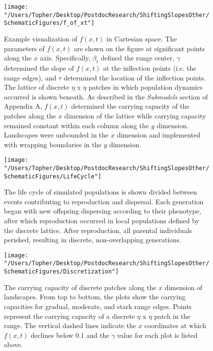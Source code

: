 \documentclass[11pt]{article}
\begin{document}
\begin{figure}[h!]
\texttt{[image: "/Users/Topher/Desktop/PostdocResearch/ShiftingSlopesOther/SchematicFigures/f\_of\_xt"]}
\caption{Example visualization of $f(x,t)$ in Cartesian space. The parameters of $f(x,t)$ are shown on the figure at significant points along the $x$ axis. Specifically, $\beta_{t}$ defined the range center, $\gamma$ determined the slope of $f(x,t)$ at the inflection points (i.e. the range edges), and $\tau$ determined the location of the inflection points. The lattice of discrete $\eta$ x $\eta$ patches in which population dynamics occurred is shown beneath. As described in the \textit{Submodels} section of Appendix A, $f(x,t)$ determined the carrying capacity of the patches along the $x$ dimension of the lattice while carrying capacity remained constant within each column along the $y$ dimension. Landscapes were unbounded in the $x$ dimension and implemented with wrapping boundaries in the $y$ dimension.}
\label{Fig:EnvFunction}
\end{figure}

\clearpage

\begin{figure}[h!]
\texttt{[image: "/Users/Topher/Desktop/PostdocResearch/ShiftingSlopesOther/SchematicFigures/LifeCycle"]}
\caption{The life cycle of simulated populations is shown divided between events contributing to reproduction and dispersal. Each generation began with new offspring dispersing according to their phenotype, after which reproduction occurred in local populations defined by the discrete lattice. After reproduction, all parental individuals perished, resulting in discrete, non-overlapping generations.}
\label{Fig:LifeCycle}
\end{figure}

\clearpage

\begin{figure}[h!]
\texttt{[image: "/Users/Topher/Desktop/PostdocResearch/ShiftingSlopesOther/SchematicFigures/Discretization"]}
\caption{The carrying capacity of discrete patches along the $x$ dimension of landscapes. From top to bottom, the plots show the carrying capacities for gradual, moderate, and stark range edges. Points represent the carrying capacity of a discrete $\eta$ x $\eta$ patch in the range. The vertical dashed lines indicate the $x$ coordinates at which $f(x,t)$ declines below $0.1$ and the $\gamma$ value for each plot is listed above.}
\label{Fig:LifeCycle}
\end{figure}
\end{document}
